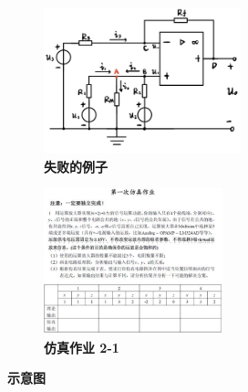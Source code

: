 \documentclass[UTF8]{report}
\theoremstyle{MyLineTheoremStyle} %
\theoremstyle{MyBlockTheoremStyle} %
\theoremstyle{MySubsubsectionStyle} %
\begin{document}
\begin{figure}[H]\centering
\begin{subfigure}[t]{0.43\textwidth}\centering
    \includegraphics[height=120pt]{assets/3/失败的例子.png}
    \caption{\bfseries 失败的例子 }
\end{subfigure}\begin{subfigure}[t]{0.43\textwidth}\centering
    \includegraphics[height=120pt]{assets/3/image (5).jpg}
    \caption{\bfseries 仿真作业 2-1 }
\end{subfigure}
\caption{\bfseries 示意图 }\label{示意图}
\end{figure}
\end{document}
